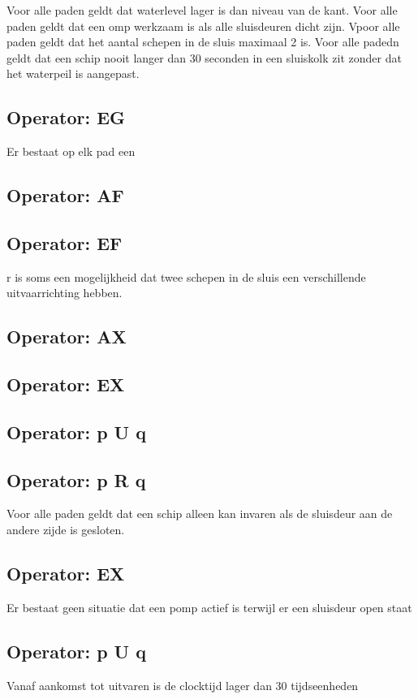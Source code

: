  
 Voor alle paden geldt dat waterlevel lager is dan niveau van de kant.
 Voor alle paden geldt dat een omp werkzaam is als alle sluisdeuren dicht zijn.
 Vpoor alle paden geldt dat het aantal schepen in de sluis maximaal 2 is.
 Voor alle padedn  geldt dat een schip nooit langer dan 30 seconden in een sluiskolk zit zonder dat het waterpeil is aangepast.
 \subsection{Operator: EG}
 Er bestaat op elk pad een 
 
 \subsection{Operator: AF}
 
 \subsection{Operator: EF}
 r is soms een mogelijkheid dat twee schepen in de sluis een verschillende uitvaarrichting hebben.
 \subsection{Operator: AX}
 
 
 \subsection{Operator: EX}
 
 \subsection{Operator: p U q}
 
 \subsection{Operator: p R q}
 
 
 Voor alle paden geldt dat een schip alleen kan invaren als de sluisdeur aan de andere zijde is gesloten.
 \subsection{Operator: EX}
 Er bestaat geen situatie dat een pomp actief is terwijl er een sluisdeur open staat
 \subsection{Operator: p U q}
 Vanaf aankomst tot uitvaren is de clocktijd lager dan 30 tijdseenheden 
